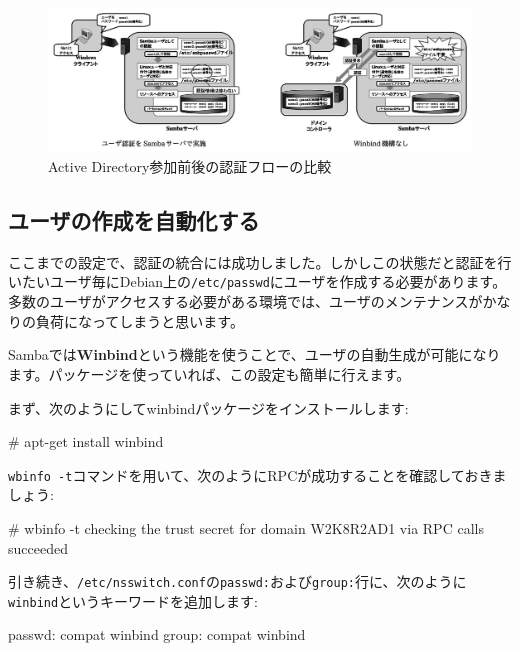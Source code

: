 \documentclass[mingoth,a4paper]{jsarticle}
\begin{document}
\begin{figure}[h]
\begin{center}
\includegraphics[width=1\hsize]{image201304/samba/monyo-winbind0_mono.png}
\end{center}
\caption{Active Directory参加前後の認証フローの比較}
\label{fig:monyo-winbind0.eps}
\end{figure}

\subsection{ユーザの作成を自動化する}

ここまでの設定で、認証の統合には成功しました。しかしこの状態だと認証を行いたいユーザ毎にDebian上の{\tt{/etc/passwd}}にユーザを作成する必要があります。多数のユーザがアクセスする必要がある環境では、ユーザのメンテナンスがかなりの負荷になってしまうと思います。

Sambaでは{\bf{Winbind}}という機能を使うことで、ユーザの自動生成が可能になります。パッケージを使っていれば、この設定も簡単に行えます。

まず、次のようにしてwinbindパッケージをインストールします:

\begin{commandline}
# apt-get install winbind
\end{commandline}

{\tt{wbinfo -t}}コマンドを用いて、次のようにRPCが成功することを確認しておきましょう:

\begin{commandline}
# wbinfo -t
checking the trust secret for domain W2K8R2AD1 via RPC calls succeeded
\end{commandline}

引き続き、{\tt{/etc/nsswitch.conf}}の{\tt{passwd:}}および{\tt{group:}}行に、次のように{\tt{winbind}}というキーワードを追加します:

\begin{commandline}
passwd:         compat winbind
group:          compat winbind
\end{commandline}
\end{document}
